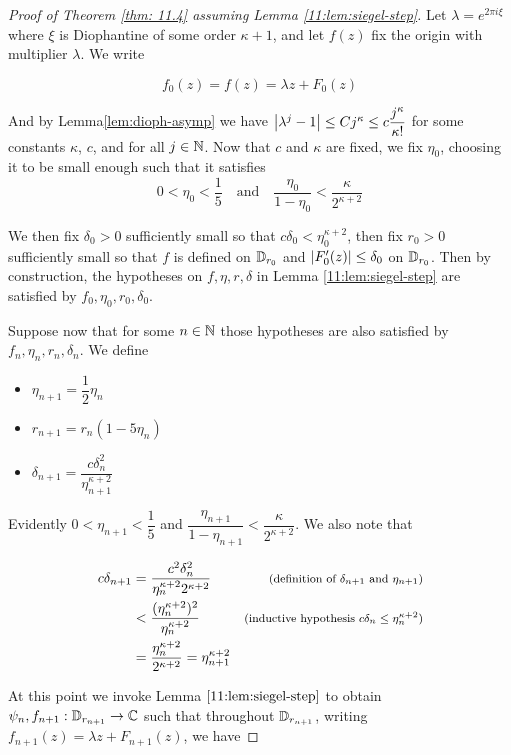 \documentclass[../main.tex]{subfiles}
\begin{document}
\begin{proof}[Proof of Theorem \ref{thm: 11.4} assuming Lemma \ref{11:lem:siegel-step}]
Let $\lambda = e^{2\pi i \xi}$ where $\xi$ is Diophantine of some order $\kappa + 1$, and let $f(z)$ fix the origin with multiplier $\lambda$. We write

\[
f_0(z) = f(z) = \lambda z + F_0(z)
\]

And by Lemma\ref{lem:dioph-asymp} we have $\left|\lambda^j - 1\right| \le C j^\kappa \le c \dfrac{j^\kappa}{\kappa!}$ for some constants $\kappa$, $c$, and for all $j \in \mathbb{N}$. Now that $c$ and $\kappa$ are fixed, we fix $\eta_0$, choosing it to be small enough such that it satisfies
\[
0 < \eta_0 < \frac{1}{5}
\quad\text{and}\quad
\frac{\eta_0}{1-\eta_0} < \frac{\kappa}{2^{\kappa+2}}
\]

We then fix $\delta_0 > 0$ sufficiently small so that $c \delta_0 < \eta_0^{\kappa+2}$, then fix $r_0 > 0$ sufficiently small so that $f$ is defined on $\mathbb{D}_{r_0}$ and $\left|F_0'(z)\right| \le \delta_0$ on $\mathbb{D}_{r_0}$. Then by construction, the hypotheses on $f, \eta, r, \delta$ in Lemma \ref{11:lem:siegel-step} are satisfied by $f_0, \eta_0, r_0, \delta_0$.

Suppose now that for some $n \in \mathbb{N}$ those hypotheses are also satisfied by $f_n, \eta_n, r_n, \delta_n$. We define

\begin{itemize}
    \item $\eta_{n+1} = \dfrac{1}{2} \eta_n$
    \item $r_{n+1} = r_n (1-5 \eta_n)$
    \item $\delta_{n+1} = \dfrac{c \delta_n^2}{\eta_{n+1}^{\kappa+2}}$
\end{itemize}

Evidently $0 < \eta_{n+1} < \dfrac{1}{5}$ and $\dfrac{\eta_{n+1}}{1-\eta_{n+1}} < \dfrac{\kappa}{2^{\kappa+2}}$. We also note that

\begin{align*}
c \delta_{n+1}
&=
\frac{c^2 \delta_n^2}{\eta_n^{\kappa+2}2^{\kappa+2}}
&\text{\footnotesize{(definition of $\delta_{n+1}$ and $\eta_{n+1}$)}}\\
&<
\frac{(\eta_n^{\kappa+2})^2}{\eta_n^{\kappa+2}}
&\text{\footnotesize{(inductive hypothesis $c \delta_n \le \eta_n^{\kappa+2}$)}}\\
&= \frac{\eta_n^{\kappa+2}}{2^{\kappa+2}} = \eta_{n+1}^{\kappa+2}
\end{align*}

At this point we invoke Lemma $\ref{11:lem:siegel-step}$ to obtain $\psi_n, f_{n+1} : \mathbb{D}_{r_{n+1}} \to \mathbb{C}$ such that throughout $\mathbb{D}_{r_{n+1}}$, writing $f_{n+1}(z) = \lambda z + F_{n+1}(z)$, we have


\end{proof}
\end{document}
